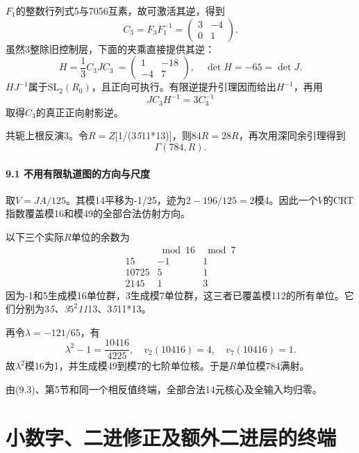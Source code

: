 \documentclass[11pt,a4paper]{article}
\theoremstyle{definition}
\numberwithin{equation}{section}
\begin{document}
{\ensuremath{F_{1}}的整数行列式5与7056互素，故可激活其逆，得到} \[
C_3=F_3F_1^{-1}=\begin{pmatrix}3&-4\\0&1\end{pmatrix}.
\] {虽然3整除旧控制层，下面的夹乘直接提供其逆：} \[
H=\frac13C_3JC_3
\ =\begin{pmatrix}1&-18\\-4&7\end{pmatrix},
\quad \det H=-65=\det J.
\tag{C16.9.2}
\] {\ensuremath{HJ^{-1}}属于\ensuremath{\mathrm{SL}_{2}(R_{0})}，且正向可执行。有限逆提升引理因而给出\ensuremath{H^{-1}}，再用} \[
JC_3H^{-1}=3C_3^{-1}
\] {取得\ensuremath{C_{3}}的真正正向射影逆。}

{共轭上根反演3。令\ensuremath{R=Z}{[}1/(3}\emph{{5}}{11*13){]}，则\ensuremath{84R=28R}，再次用深同余引理得到} \[
\boxed{\Gamma(784,R).}
\tag{C16.9.3}
\]

\paragraph*{\texorpdfstring{{9.1} {不用有限轨道图的方向与尺度}}{9.1 不用有限轨道图的方向与尺度}}\label{C16-h122}

{取\ensuremath{V=JA/125}。其模14平移为-1/25，迹为\ensuremath{2-196/125=2}模4。因此一个\ensuremath{V}的CRT指数覆盖模16和模49的全部合法仿射方向。}

{以下三个实际\ensuremath{R}单位的余数为} \[
\begin{array}{c|cc}
&\bmod16&\bmod7\\ \hline
15&-1&1\\
10725&5&1\\
2145&1&3
\end{array}
\] {因为-1和5生成模16单位群，3生成模7单位群，这三者已覆盖模112的所有单位。它们分别为3}\emph{{5、3}}{\ensuremath{5^{2}}}\emph{{11}}{13、3}\emph{{5}}{11*13。}

{再令\ensuremath{\lambda =-121/65}，有} \[
\lambda^2-1=\frac{10416}{4225},
\quad v_2(10416)=4,\quad v_7(10416)=1.
\] {故\ensuremath{\lambda ^{2}}模16为1，并生成模49到模7的七阶单位核。于是\ensuremath{R}单位模784满射。}

{由(9.3)、第5节和同一个相反值终端，全部合法14元核心及全输入均归零。}


\section{小数字、二进修正及额外二进层的终端}\label{construct:small-digit}
\end{document}
